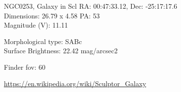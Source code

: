 \begin{block}{NGC0253, Galaxy in Scl}
    RA: 00:47:33.12, Dec: -25:17:17.6 \\ 
    Dimensions: 26.79 x 4.58 PA: 53 \\ 
    Magnitude (V): 11.11

    Morphological type: SABc \\ 
    Surface Brightness: 22.42 mag/arcsec2 


    Finder fov: 60 

    \url{https://en.wikipedia.org/wiki/Sculptor_Galaxy} 
\end{block}
